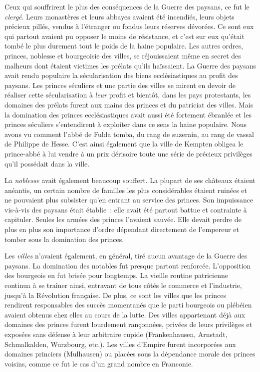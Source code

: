 \documentclass[french,twoside]{book} %
\begin{document}
Ceux qui souffrirent le plus des conséquences de la Guerre des paysans, ce fut le \emph{clergé}. Leurs monastères et leurs abbayes avaient été incendiés, leurs objets précieux pillés, vendus à l’étranger ou fondus leurs réserves dévorées. Ce sont eux qui partout avaient pu opposer le moins de résistance, et c’est sur eux qu’était tombé le plus durement tout le poids de la haine populaire. Les autres ordres, princes, noblesse et bourgeoisie des villes, se réjouissaient même en secret des malheurs dont étaient victimes les prélats qu’ils haïssaient. La Guerre des paysans avait rendu populaire la sécularisation des biens ecclésiastiques au profit des paysans. Les princes séculiers et une partie des villes se mirent en devoir de réaliser cette sécularisation à \emph{leur} profit et bientôt, dans les pays protestants, les domaines des prélats furent aux mains des princes et du patriciat des villes. Mais la domination des princes ecclésiastiques avait aussi été fortement ébranlée et les princes séculiers s’entendirent à exploiter dans ce sens la haine populaire. Nous avons vu comment l’abbé de Fulda tomba, du rang de suzerain, au rang de vassal de Philippe de Hesse. C’est ainsi également que la ville de Kempten obligea le prince-abbé à lui vendre à un prix dérisoire toute une série de précieux privilèges qu’il possédait dans la ville.\par
La \emph{noblesse} avait également beaucoup souffert. La plupart de ses châteaux étaient anéantis, un certain nombre de familles les plus considérables étaient ruinées et ne pouvaient plus subsister qu’en entrant au service des princes. Son impuissance vis-à-vis des paysans était établie : elle avait été partout battue et contrainte à capituler. Seules les armées des princes l’avaient sauvée. Elle devait perdre de plus en plus son importance d’ordre dépendant directement de l’empereur et tomber sous la domination des princes.\par
Les \emph{villes} n’avaient également, en général, tiré aucun avantage de la Guerre des paysans. La domination des notables fut presque partout renforcée. L’opposition des bourgeois en fut brisée pour longtemps. La vieille routine patricienne continua à se traîner ainsi, entravant de tous côtés le commerce et l’industrie, jusqu’à la Révolution française. De plus, ce sont les villes que les princes rendirent responsables des succès momentanés que le parti bourgeois ou plébéien avaient obtenus chez elles au cours de la lutte. Des villes appartenant déjà aux domaines des princes furent lourdement rançonnées, privées de leurs privilèges et exposées sans défense à leur arbitraire cupide (Frankenhausen, Arnstadt, Schmalkalden, Wurzbourg, etc.). Les villes d’Empire furent incorporées aux domaines princiers (Mulhausen) ou placées sous la dépendance morale des princes voisins, comme ce fut le cas d’un grand nombre en Franconie.\par
\end{document}
